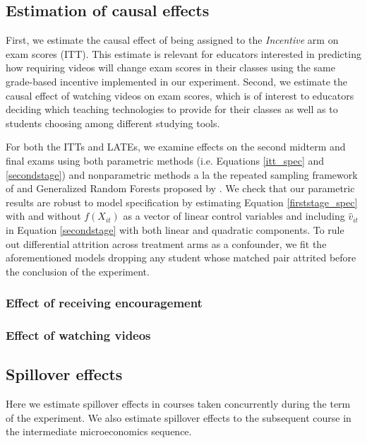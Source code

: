 \documentclass[12pt]{article}
\begin{document}
\subsection{Estimation of causal effects}

First, we estimate the causal effect of being assigned to the \textit{Incentive} arm on exam scores (ITT). This estimate is relevant for educators interested in predicting how requiring videos will change exam scores in their classes using the same grade-based incentive implemented in our experiment. Second, we estimate the causal effect of watching videos on exam scores, which is of interest to educators deciding which teaching technologies to provide for their classes as well as to students choosing among different studying tools.

For both the ITTs and LATEs, we examine effects on the second midterm and final exams using both parametric methods (i.e. Equations \ref{itt_spec} and \ref{secondstage}) and nonparametric methods a la the repeated sampling framework of \textcite{neyman1923} and Generalized Random Forests proposed by \textcite{wa2018}. We check that our parametric results are robust to model specification by estimating Equation \ref{firststage_spec} with and without $f(X_{it})$ as a vector of linear control variables and including $\hat{v}_{it}$ in Equation \ref{secondstage} with both linear and quadratic components. To rule out differential attrition across treatment arms as a confounder, we fit the aforementioned models dropping any student whose matched pair attrited before the conclusion of the experiment.

\subsubsection{Effect of receiving encouragement}

\subsubsection{Effect of watching videos}


\subsection{Spillover effects}

Here we estimate spillover effects in courses taken concurrently during the term of the experiment. We also estimate spillover effects to the subsequent course in the intermediate microeconomics sequence.
\end{document}
